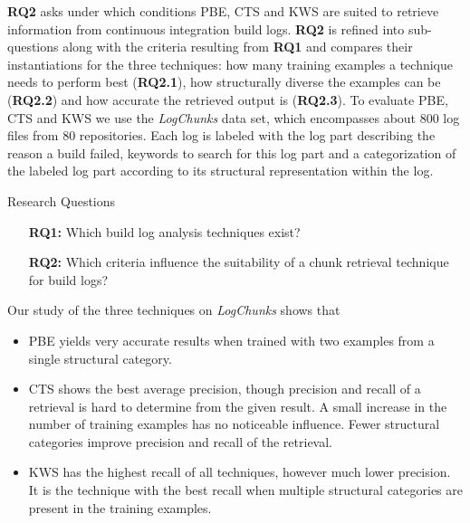 \textbf{RQ2} asks under which conditions PBE, CTS and KWS are suited to retrieve information from continuous integration build logs.
\textbf{RQ2} is refined into sub-questions along with the criteria resulting from \textbf{RQ1} and compares their instantiations for the three techniques:
how many training examples a technique needs to perform best (\textbf{RQ2.1}), how structurally diverse the examples can be (\textbf{RQ2.2}) and how accurate the retrieved output is (\textbf{RQ2.3}).
To evaluate PBE, CTS and KWS we use the \emph{LogChunks} data set, which encompasses about 800 log files from 80 repositories.
Each log is labeled with the log part describing the reason a build failed, keywords to search for this log part and a categorization of the labeled log part according to its structural representation within the log.


\begin{simplebox}{Research Questions}
\begin{itemize}
  \item[\textbf{RQ1:}] Which build log analysis techniques exist?
  \item[\textbf{RQ2:}] Which criteria influence the suitability of a chunk retrieval technique for build logs?
\end{itemize}
\end{simplebox}



Our study of the three techniques on \emph{LogChunks} shows that
\begin{itemize}
  \item PBE yields very accurate results when trained with two examples from a single structural category.
  \item CTS shows the best average precision, though precision and recall of a retrieval is hard to determine from the given result.
  A small increase in the number of training examples has no noticeable influence.
  Fewer structural categories improve precision and recall of the retrieval.
  \item KWS has the highest recall of all techniques, however much lower precision.
  It is the technique with the best recall when multiple structural categories are present in the training examples.
\end{itemize}

